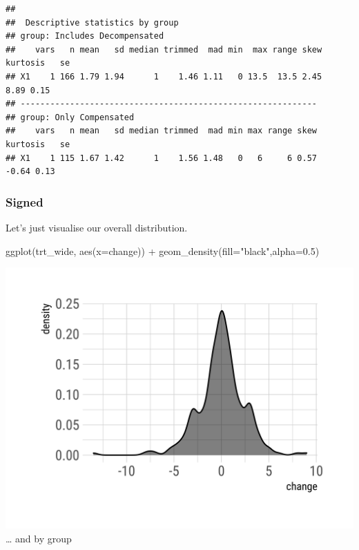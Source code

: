 \documentclass[
]{article}
\newenvironment{Shaded}{\begin{snugshade}}{\end{snugshade}}
\newcommand{\AttributeTok}[1]{\textcolor[rgb]{0.77,0.63,0.00}{#1}}
\newcommand{\FloatTok}[1]{\textcolor[rgb]{0.00,0.00,0.81}{#1}}
\newcommand{\FunctionTok}[1]{\textcolor[rgb]{0.00,0.00,0.00}{#1}}
\newcommand{\NormalTok}[1]{#1}
\newcommand{\SpecialCharTok}[1]{\textcolor[rgb]{0.00,0.00,0.00}{#1}}
\newcommand{\StringTok}[1]{\textcolor[rgb]{0.31,0.60,0.02}{#1}}
\begin{document}
\begin{Shaded}
\end{Shaded}

\begin{verbatim}
## 
##  Descriptive statistics by group 
## group: Includes Decompensated
##    vars   n mean   sd median trimmed  mad min  max range skew kurtosis   se
## X1    1 166 1.79 1.94      1    1.46 1.11   0 13.5  13.5 2.45     8.89 0.15
## ------------------------------------------------------------ 
## group: Only Compensated
##    vars   n mean   sd median trimmed  mad min max range skew kurtosis   se
## X1    1 115 1.67 1.42      1    1.56 1.48   0   6     6 0.57    -0.64 0.13
\end{verbatim}

\hypertarget{signed}{%
\subsubsection{Signed}\label{signed}}

Let's just visualise our overall distribution.

\begin{Shaded}
\begin{Highlighting}[]
\FunctionTok{ggplot}\NormalTok{(trt\_wide, }\FunctionTok{aes}\NormalTok{(}\AttributeTok{x=}\NormalTok{change)) }\SpecialCharTok{+}
  \FunctionTok{geom\_density}\NormalTok{(}\AttributeTok{fill=}\StringTok{"black"}\NormalTok{,}\AttributeTok{alpha=}\FloatTok{0.5}\NormalTok{)}
\end{Highlighting}
\end{Shaded}

\includegraphics{figures/unnamed-chunk-28-1.png} \ldots{} and by group
\end{document}
